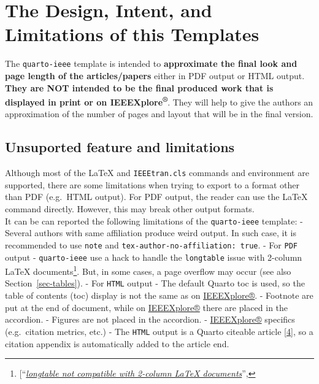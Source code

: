 \documentclass[
  journal,
]{IEEEtran}%
\theoremstyle{plain}
\theoremstyle{remark}
\begin{document}
\hypertarget{the-design-intent-and-limitations-of-this-templates}{%
\section{The Design, Intent, and Limitations of this
Templates}\label{the-design-intent-and-limitations-of-this-templates}}

The \texttt{quarto-ieee} template is intended to \textbf{approximate the
final look and page length of the articles/papers} either in PDF output
or HTML output. \textbf{They are NOT intended to be the final produced
work that is displayed in print or on IEEEXplore\textsuperscript{®}}.
They will help to give the authors an approximation of the number of
pages and layout that will be in the final version.

\hypertarget{unsuported-feature-and-limitations}{%
\subsection{Unsuported feature and
limitations}\label{unsuported-feature-and-limitations}}

Although most of the {\LaTeX} and \texttt{IEEEtran.cls} commands and
environment are supported, there are some limitations when trying to
export to a format other than PDF (e.g.~HTML output). For PDF output,
the reader can use the {\LaTeX} command directly. However, this may
break other output formats.\\
It can be can reported the following limitations of the
\texttt{quarto-ieee} template: - Several authors with same affiliation
produce weird output. In such case, it is recommended to use
\texttt{note} and \texttt{tex-author-no-affiliation:\ true}. - For
\texttt{PDF} output - \texttt{quarto-ieee} use a hack to handle the
\texttt{longtable} issue with 2-column {\LaTeX} documents\footnote{{[}``\emph{\href{https://github.com/jgm/pandoc/issues/1023\%3E}{longtable
  not compatible with 2-column LaTeX documents}}'',}. But, in some
cases, a page overflow may occur (see also Section~\ref{sec-tables}). -
For \texttt{HTML} output - The default Quarto toc is used, so the table
of contents (toc) display is not the same as on
\href{https://ieeexplore.ieee.org/}{IEEEXplore®}. - Footnote are put at
the end of document, while on
\href{https://ieeexplore.ieee.org/}{IEEEXplore®} there are placed in the
accordion. - Figures are not placed in the accordion. -
\href{https://ieeexplore.ieee.org/}{IEEEXplore®} specifics
(e.g.~citation metrics, etc.) - The \texttt{HTML} output is a Quarto
citeable article \protect\hyperlink{ref-quarto-citation}{{[}4{]}}, so a
citation appendix is automatically added to the article end.
\end{document}
